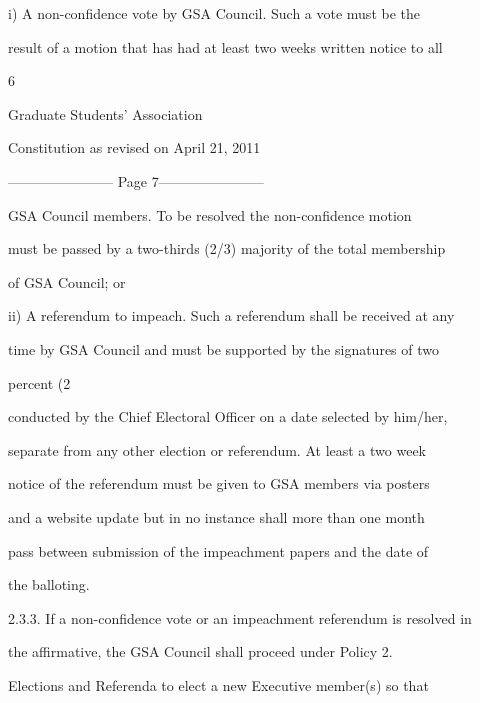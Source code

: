 i)      A  non-confidence  vote  by  GSA  Council.  Such  a  vote  must  be  the  

        result of a motion that has had at least two weeks written notice to all  



                                                 

                                               6  



                                Graduate Students’ Association  



                           Constitution as revised on April 21, 2011  


----------------------- Page 7-----------------------

        GSA  Council  members.  To  be  resolved  the  non-confidence  motion  

        must  be passed by a two-thirds (2/3) majority of the total membership  

        of GSA Council; or  



ii)     A referendum to impeach. Such a referendum shall be received at any  

        time by GSA Council and must be supported by the signatures of two  

        percent (2%

        conducted by the Chief Electoral Officer on a date selected by him/her,  

        separate from any other election or referendum. At least a two week  

        notice of the referendum must be given to GSA members via posters  

        and  a  website  update  but  in  no  instance  shall  more  than  one  month  

        pass between submission  of the  impeachment  papers  and  the  date  of  

        the balloting.  



2.3.3. If a non-confidence vote or an impeachment referendum is resolved in  

        the  affirmative,  the  GSA  Council  shall  proceed  under  Policy  2.  

        Elections  and Referenda  to  elect  a  new  Executive  member(s)  so that  

